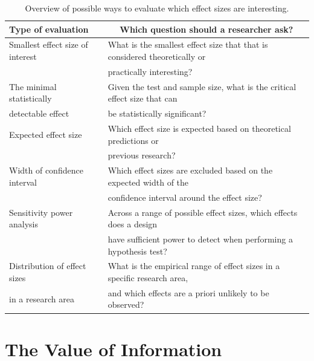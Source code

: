 \documentclass[
  english,
  ,jou, a4paper,floatsintext]{apa6}
\begin{document}
\begin{table}[tbp]

\begin{center}
\begin{threeparttable}

\caption{\label{tab:table-effect-eval}Overview of possible ways to evaluate which effect sizes are interesting.}

\begin{tabular}{ll}
\toprule
Type of evaluation & \multicolumn{1}{c}{Which question should a researcher ask?}\\
\midrule
Smallest effect size of interest & What is the smallest effect size that that is considered theoretically or\\
 & practically interesting?\\ \midrule
The minimal statistically & Given the test and sample size, what is the critical effect size that can\\
detectable effect & be statistically significant?\\ \midrule
Expected effect size & Which effect size is expected based on theoretical predictions or\\
 & previous research?\\ \midrule
Width of confidence interval & Which effect sizes are excluded based on the expected width of the\\
 & confidence interval around the effect size?\\ \midrule
Sensitivity power analysis & Across a range of possible effect sizes, which effects does a design\\
 & have sufficient power to detect when performing a hypothesis test?\\ \midrule
Distribution of effect sizes & What is the empirical range of effect sizes in a specific research area,\\
in a research area & and which effects are a priori unlikely to be observed?\\
\bottomrule
\end{tabular}

\end{threeparttable}
\end{center}

\end{table}

\hypertarget{the-value-of-information}{%
\section{The Value of Information}\label{the-value-of-information}}
\end{document}
